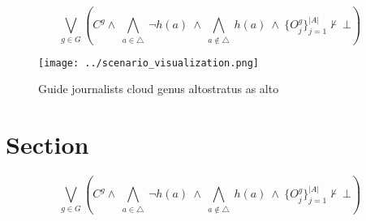 \documentclass[a4paper]{article}
\begin{document}
\[\bigvee_{g\in G} (C^g \wedge\ \bigwedge_{a\in \triangle}\ \neg h(a)\ \wedge\ \bigwedge_{a\notin \triangle}\ h(a)\ \wedge\ \{O_j^g\}_{j=1}^{|A|} \nvdash\ \bot )\]

\begin{figure}
\centering
\texttt{[image: ../scenario\_visualization.png]}
\caption{Guide journalists cloud genus altostratus as alto
}
\end{figure}
 
\section{Section}

\[\bigvee_{g\in G} (C^g \wedge\ \bigwedge_{a\in \triangle}\ \neg h(a)\ \wedge\ \bigwedge_{a\notin \triangle}\ h(a)\ \wedge\ \{O_j^g\}_{j=1}^{|A|} \nvdash\ \bot )\]
\end{document}
